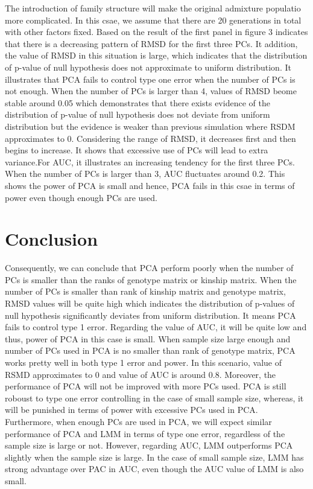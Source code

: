 \documentclass[12pt]{article}
\begin{document}
The introduction of family structure will make the original admixture populatio more complicated. In this csae, we assume that there are 20 generations in total with other factors fixed. Based on the result of the first panel in figure 3 indicates that there is a decreasing pattern of RMSD for the first three PCs. It addition, the value of RMSD in this situation is large, which indicates that the distribution of p-value of null hypothesis does not approximate to uniform distribution. It illustrates that PCA fails to control type one error when the number of PCs is not enough. When the number of PCs is larger than 4, values of RMSD beome stable around 0.05 which demonstrates that there exists evidence of the distribution of p-value of null hypothesis does not deviate from uniform distribution but the evidence is weaker than previous simulation where RSDM approximates to 0. Considering the range of RMSD, it decreases first and then begins to increase. It shows that excessive use of PCs will lead to extra variance.For AUC, it illustrates an increasing tendency for the first three PCs. When the number of PCs is larger than 3, AUC fluctuates around 0.2. This shows the power of PCA is small and hence, PCA fails in this csae in terms of power even though enough PCs are used. 

\section{Conclusion}


Consequently, we can conclude that PCA perform poorly when the number of PCs is smaller than the ranks of genotype matrix or kinship matrix. When the number of PCs is smaller than rank of kinship matrix and genotype matrix, RMSD values will be quite high which indicates the distribution of p-values of null hypothesis significantly deviates from uniform distribution. It means PCA fails to control type 1 error. Regarding the value of AUC, it will be quite low and thus, power of PCA in this case is small. When sample size large enough and number of PCs used in PCA is no smaller than rank of genotype matrix, PCA works pretty well in both type 1 error and power. In this scenario, value of RSMD approximates to 0 and value of AUC is around 0.8. Moreover, the performance of PCA will not be improved with more PCs used. PCA is still roboust to type one error controlling in the case of small sample size, whereas, it will be punished in terms of power with excessive PCs used in PCA. Furthermore, when enough PCs are used in PCA, we will expect similar performance of PCA and LMM in terms of type one error, regardless of the sample size is large or not. However, regarding AUC, LMM outperforms PCA slightly when the sample size is large. In the case of small sample size, LMM has strong advantage over PAC in AUC, even though the AUC value of LMM is also small. 
\end{document}
